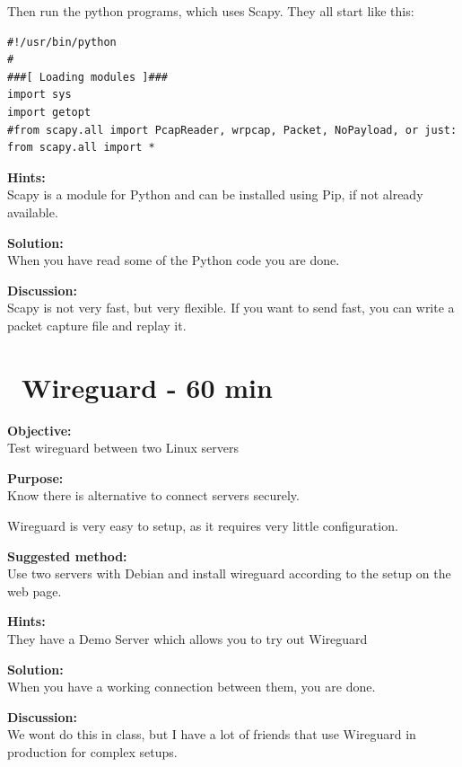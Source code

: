 \documentclass[a4paper,11pt,notitlepage]{report}
\begin{document}
Then run the python programs, which uses Scapy. They all start like this:

\begin{verbatim}
#!/usr/bin/python
#
###[ Loading modules ]###
import sys
import getopt
#from scapy.all import PcapReader, wrpcap, Packet, NoPayload, or just:
from scapy.all import *
\end{verbatim}

{\bf Hints:}\\
Scapy is a module for Python and can be installed using Pip, if not already available.

{\bf Solution:}\\
When you have read some of the Python code you are done.

{\bf Discussion:}\\
Scapy is not very fast, but very flexible. If you want to send fast, you can write a packet capture file and replay it.



\chapter{\faInfoCircle\ Wireguard - 60 min}
\label{ex:wireguard-setup}

{\bf Objective:}\\
Test wireguard between two Linux servers


{\bf Purpose:}\\
Know there is alternative to connect servers securely.

Wireguard is very easy to setup, as it requires very little configuration.


{\bf Suggested method:}\\
Use two servers with Debian and install wireguard according to the setup on the web page.



{\bf Hints:}\\
They have a Demo Server which allows you to try out Wireguard

{\bf Solution:}\\
When you have a working connection between them, you are done.

{\bf Discussion:}\\
We wont do this in class, but I have a lot of friends that use Wireguard in production for complex setups.
\end{document}
